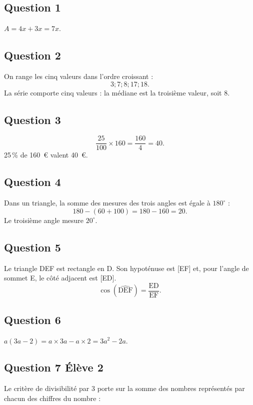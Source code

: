 \subsection*{Question 1}

$A = 4x+3x = 7x$.

\subsection*{Question 2}

On range les cinq valeurs dans l'ordre croissant :
\[3 ; 7 ; 8 ; 17 ; 18.\]
La série comporte cinq valeurs : la médiane est la troisième valeur, soit 8.

\subsection*{Question 3}

\[\dfrac{25}{100}\times 160 = \dfrac{160}{4}= 40.\]
25\,\% de 160~\euro{} valent 40~\euro.

\subsection*{Question 4}

Dans un triangle, la somme des mesures des trois angles est égale à $180^{\circ}$ :
\[180 - (60+100) = 180-160 = 20.\]
Le troisième angle mesure $20^{\circ}$.

\subsection*{Question 5}

Le triangle DEF est rectangle en D. Son hypoténuse est [EF] et, pour l'angle de sommet E, le côté adjacent est [ED].
\[\cos\left(\widehat{\text{DEF}}\right)=\dfrac{\text{ED}}{\text{EF}}.\]

\subsection*{Question 6}

$a(3a-2) = a\times 3a - a\times 2 = 3a^{2}-2a$.

\subsection*{Question 7 \quad Élève 2}

Le critère de divisibilité par 3 porte sur la somme des nombres représentés par chacun des chiffres du nombre :

